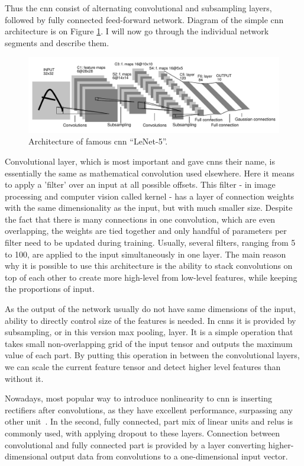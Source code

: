 Thus the \gls{cnn} consist of alternating convolutional and subsampling layers, followed by fully connected feed-forward network. Diagram of the simple \gls{cnn} architecture is on Figure \ref{fig:lenet}. I will now go through the individual network segments and describe them.

\begin{figure}[!t]
	\centering
	\includegraphics[width=\textwidth]{./fig/lenet.pdf}
	\caption{Architecture of famous \gls{cnn} \textquotedblleft LeNet-5\textquotedblright.~\cite{lecun-98}
		\label{fig:lenet}}
\end{figure}

Convolutional layer, which is most important and gave \gls{cnn}s their name, is essentially the same as mathematical convolution used elsewhere. Here it means to apply a 'filter' over an input at all possible offsets. This filter - in image processing and computer vision called kernel - has a layer of connection weights with the same dimensionality as the input, but with much smaller size. Despite the fact that there is many connections in one convolution, which are even overlapping, the weights are tied together and only handful of parameters per filter need to be updated during training. Usually, several filters, ranging from 5 to 100, are applied to the input simultaneously in one layer. The main reason why it is possible to use this architecture is the ability to stack convolutions on top of each other to create more high-level from low-level features, while keeping the proportions of input.

As the output of the network usually do not have same dimensions of the input, ability to directly control size of the features is needed. In \gls{cnn}s it is provided by subsampling, or in this version max pooling, layer. It is a simple operation that takes small non-overlapping grid of the input tensor and outputs the maximum value of each part. By putting this operation in between the convolutional layers, we can scale the current feature tensor and detect higher level features than without it.

Nowadays, most popular way to introduce nonlinearity to \gls{cnn} is inserting rectifiers after convolutions, as they have excellent performance, surpassing any other unit~\cite{jarrett-iccv-09, DBLP:conf/icml/NairH10}. In the second, fully connected, part mix of linear units and \gls{relu}s is commonly used, with applying dropout to these layers. Connection between convolutional and fully connected part is provided by a layer converting higher-dimensional output data from convolutions to a one-dimensional input vector.

